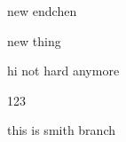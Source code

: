 \documentclass[a4 paper,12pt]{article}
\begin{document}
new endchen

new thing

hi not hard anymore
 
123

this is smith branch
\end{document}
